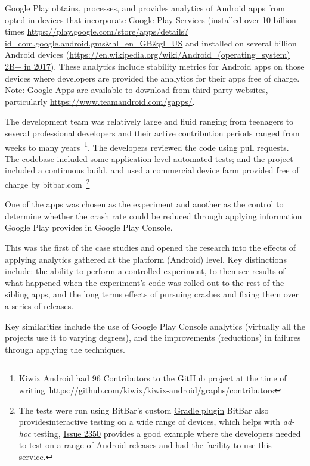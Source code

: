 Google Play obtains, processes, and provides analytics of Android apps from opted-in devices that incorporate Google Play Services (installed over 10 billion times \url{https://play.google.com/store/apps/details?id=com.google.android.gms&hl=en\_GB&gl=US} and installed on several billion Android devices (\url{https://en.wikipedia.org/wiki/Android_(operating_system) 2B+ in 2017}). These analytics include stability metrics for Android apps on those devices where developers are provided the analytics for their apps free of charge.
Note: Google Apps are available to download from third-party websites, particularly \url{https://www.teamandroid.com/gapps/}. 


The development team was relatively large and fluid ranging from teenagers to several professional developers and their active contribution periods ranged from weeks to many years~\footnote{Kiwix Android had 96 Contributors to the GitHub project at the time of writing~\url{https://github.com/kiwix/kiwix-android/graphs/contributors}}. The developers reviewed the code using pull requests.  The codebase included some application level automated tests; and the project included a continuous build, and used a commercial device farm provided free of charge by bitbar.com~\footnote{The tests were run using BitBar's custom \href{https://support.smartbear.com/bitbar/docs/integrations/gradle.html}{Gradle plugin} BitBar also providesinteractive testing on a wide range of devices, which helps with \emph{ad-hoc} testing, \href{https://github.com/kiwix/kiwix-android/pull/2350}{Issue 2350} provides a good example where the developers needed to test on a range of Android releases and had the facility to use this service.} 

One of the apps was chosen as the experiment and another as the control to determine whether the crash rate could be reduced through applying information Google Play provides in Google Play Console.

This was the first of the case studies and opened the research into the effects of applying analytics gathered at the platform (Android) level. Key distinctions include: the ability to perform a controlled experiment, to then see results of what happened when the experiment’s code was rolled out to the rest of the sibling apps, and the long terms effects of pursuing crashes and fixing them over a series of releases.

Key similarities include the use of Google Play Console analytics (virtually all the projects use it to varying degrees), and the improvements (reductions) in failures through applying the techniques. 

